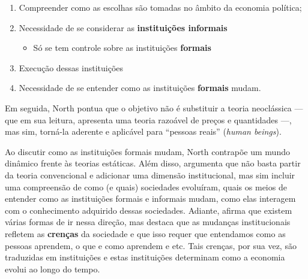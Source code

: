 \documentclass[9pt,twocolumn,twoside,lineno]{style}
\begin{document}
\begin{enumerate}
	\item Compreender como as escolhas são tomadas no âmbito da economia política;
	\item Necessidade de se considerar as \textbf{instituições informais}
	\begin{itemize}
		\item Só se tem controle sobre as instituições \textbf{formais}
	\end{itemize}
	\item Execução dessas instituições
	\item Necessidade de se entender como as instituições \textbf{formais} mudam.
\end{enumerate}
Em seguida, North pontua que o objetivo não é substituir a teoria neoclássica --- que em sua leitura, apresenta uma teoria razoável de preços e quantidades ---, mas sim, torná-la aderente e aplicável para ``pessoas reais'' (\textit{human beings}).

Ao discutir como as instituições formais mudam, North contrapõe um mundo dinâmico frente às teorias estáticas. Além disso, argumenta que não basta partir da teoria convencional e adicionar uma dimensão institucional, mas sim incluir uma compreensão de como (e quais) sociedades evoluíram, quais os meios de entender como as instituições formais e informais mudam, como elas interagem com o conhecimento adquirido dessas sociedades. Adiante, afirma que existem várias formas de ir nessa direção, mas destaca que as mudanças institucionais refletem as \textbf{crenças} da sociedade e que isso requer que entendamos como as pessoas aprendem, o que e como aprendem e etc. Tais crenças, por sua vez, são traduzidas em instituições e estas instituições determinam como a economia evolui ao longo do tempo.
\end{document}

